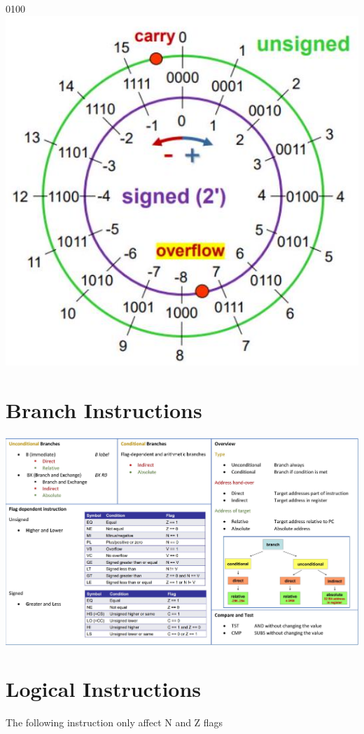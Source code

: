 \documentclass[10pt]{article}
\begin{document}
0100\\
\includegraphics[width=\linewidth]{images/2024_12_29_79e6b22f503fb7b4f718g-04(2)}

\section*{Branch Instructions}
\begin{center}
\includegraphics[width=\linewidth]{images/2024_12_29_79e6b22f503fb7b4f718g-05}
\end{center}

\section*{Logical Instructions}
The following instruction only affect N and Z flags
\end{document}
